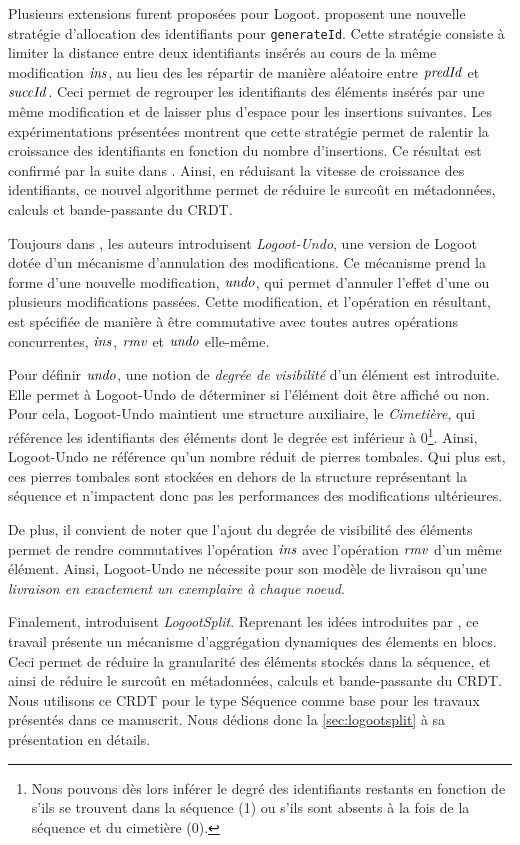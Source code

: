 Plusieurs extensions furent proposées pour Logoot.
\textcite{2010-logoot-undo-weiss} proposent une nouvelle stratégie d'allocation des identifiants pour \texttt{generateId}.
Cette stratégie consiste à limiter la distance entre deux identifiants insérés au cours de la même modification $\mathit{ins}$, au lieu des les répartir de manière aléatoire entre $\mathit{predId}$ et $\mathit{succId}$.
Ceci permet de regrouper les identifiants des éléments insérés par une même modification et de laisser plus d'espace pour les insertions suivantes.
Les expérimentations présentées montrent que cette stratégie permet de ralentir la croissance des identifiants en fonction du nombre d'insertions.
Ce résultat est confirmé par la suite dans \cite{2011-evaluation-crdts-ahmed-nacer}.
Ainsi, en réduisant la vitesse de croissance des identifiants, ce nouvel algorithme permet de réduire le surcoût en métadonnées, calculs et bande-passante du \ac{CRDT}.

Toujours dans \cite{2010-logoot-undo-weiss}, les auteurs introduisent \emph{Logoot-Undo}, une version de Logoot dotée d'un mécanisme d'annulation des modifications.
Ce mécanisme prend la forme d'une nouvelle modification, $\mathit{undo}$, qui permet d'annuler l'effet d'une ou plusieurs modifications passées.
Cette modification, et l'opération en résultant, est spécifiée de manière à être commutative avec toutes autres opérations concurrentes, \ie $\mathit{ins}$, $\mathit{rmv}$ et $\mathit{undo}$ elle-même.

Pour définir $\mathit{undo}$, une notion de \emph{degrée de visibilité} d'un élément est introduite.
Elle permet à Logoot-Undo de déterminer si l'élément doit être affiché ou non.
Pour cela, Logoot-Undo maintient une structure auxiliaire, le \emph{Cimetière}, qui référence les identifiants des éléments dont le degrée est inférieur à 0\footnote{Nous pouvons dès lors inférer le degré des identifiants restants en fonction de s'ils se trouvent dans la séquence (1) ou s'ils sont absents à la fois de la séquence et du cimetière (0).}.
Ainsi, Logoot-Undo ne référence qu'un nombre réduit de pierres tombales.
Qui plus est, ces pierres tombales sont stockées en dehors de la structure représentant la séquence et n'impactent donc pas les performances des modifications ultérieures.

De plus, il convient de noter que l'ajout du degrée de visibilité des éléments permet de rendre commutatives l'opération $\mathit{ins}$ avec l'opération $\mathit{rmv}$ d'un même élément.
Ainsi, Logoot-Undo ne nécessite pour son modèle de livraison qu'une \emph{livraison en exactement un exemplaire à chaque noeud}.

Finalement, \textcite{2013-logootsplit} introduisent \emph{LogootSplit}.
Reprenant les idées introduites par \cite{2012-string-wise}, ce travail présente un mécanisme d'aggrégation dynamiques des élements en blocs.
Ceci permet de réduire la granularité des éléments stockés dans la séquence, et ainsi de réduire le surcoût en métadonnées, calculs et bande-passante du \ac{CRDT}.
Nous utilisons ce \ac{CRDT} pour le type Séquence comme base pour les travaux présentés dans ce manuscrit.
Nous dédions donc la \autoref{sec:logootsplit} à sa présentation en détails.

